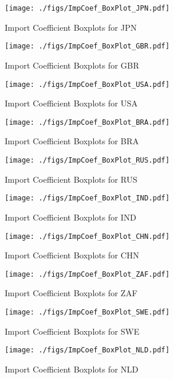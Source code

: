 \documentclass[11pt]{article}
\begin{document}
\begin{figure}[t]
\centering
\texttt{[image: ./figs/ImpCoef\_BoxPlot\_JPN.pdf]}
\caption{Import Coefficient Boxplots for JPN}
\end{figure}

\begin{figure}[t]
\centering
\texttt{[image: ./figs/ImpCoef\_BoxPlot\_GBR.pdf]}
\caption{Import Coefficient Boxplots for GBR}
\end{figure}

\begin{figure}[t]
\centering
\texttt{[image: ./figs/ImpCoef\_BoxPlot\_USA.pdf]}
\caption{Import Coefficient Boxplots for USA}
\end{figure}

\begin{figure}[t]
\centering
\texttt{[image: ./figs/ImpCoef\_BoxPlot\_BRA.pdf]}
\caption{Import Coefficient Boxplots for BRA}
\end{figure}

\begin{figure}[t]
\centering
\texttt{[image: ./figs/ImpCoef\_BoxPlot\_RUS.pdf]}
\caption{Import Coefficient Boxplots for RUS}
\end{figure}

\begin{figure}[t]
\centering
\texttt{[image: ./figs/ImpCoef\_BoxPlot\_IND.pdf]}
\caption{Import Coefficient Boxplots for IND}
\end{figure}

\begin{figure}[t]
\centering
\texttt{[image: ./figs/ImpCoef\_BoxPlot\_CHN.pdf]}
\caption{Import Coefficient Boxplots for CHN}
\end{figure}

\begin{figure}[t]
\centering
\texttt{[image: ./figs/ImpCoef\_BoxPlot\_ZAF.pdf]}
\caption{Import Coefficient Boxplots for ZAF}
\end{figure}

\begin{figure}[t]
\centering
\texttt{[image: ./figs/ImpCoef\_BoxPlot\_SWE.pdf]}
\caption{Import Coefficient Boxplots for SWE}
\end{figure}

\begin{figure}[t]
\centering
\texttt{[image: ./figs/ImpCoef\_BoxPlot\_NLD.pdf]}
\caption{Import Coefficient Boxplots for NLD}
\end{figure}
\end{document}
